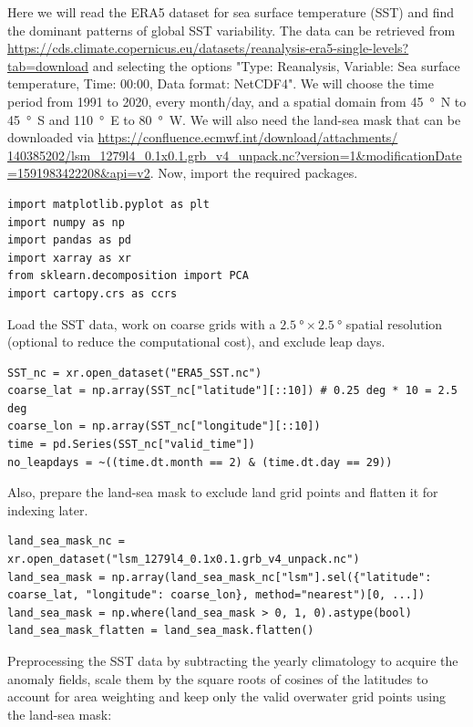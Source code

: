 Here we will read the ERA5 dataset for sea surface temperature (SST) and find the dominant patterns of global SST variability. The data can be retrieved from \href{https://cds.climate.copernicus.eu/datasets/reanalysis-era5-single-levels?tab=download}{https://cds.climate.copernicus.eu/datasets/reanalysis-era5-single-levels?tab=download} and selecting the options "Type: Reanalysis, Variable: Sea surface temperature, Time: 00:00, Data format: NetCDF4". We will choose the time period from 1991 to 2020, every month/day, and a spatial domain from \SI{45}{\degree N} to \SI{45}{\degree S} and \SI{110}{\degree E} to \SI{80}{\degree W}. We will also need the land-sea mask that can be downloaded via \href{https://confluence.ecmwf.int/download/attachments/140385202/lsm_1279l4_0.1x0.1.grb_v4_unpack.nc?version=1&modificationDate=1591983422208&api=v2}{https://confluence.ecmwf.int/download/attachments/\\140385202/lsm\_1279l4\_0.1x0.1.grb\_v4\_unpack.nc?version=1\&modificationDate\\=1591983422208\&api=v2}. Now, import the required packages.
\begin{lstlisting}
import matplotlib.pyplot as plt
import numpy as np
import pandas as pd
import xarray as xr
from sklearn.decomposition import PCA
import cartopy.crs as ccrs
\end{lstlisting}
Load the SST data, work on coarse grids with a $\SI{2.5}{\degree} \times \SI{2.5}{\degree}$ spatial resolution (optional to reduce the computational cost), and exclude leap days.
\begin{lstlisting}
SST_nc = xr.open_dataset("ERA5_SST.nc")
coarse_lat = np.array(SST_nc["latitude"][::10]) # 0.25 deg * 10 = 2.5 deg
coarse_lon = np.array(SST_nc["longitude"][::10])
time = pd.Series(SST_nc["valid_time"])
no_leapdays = ~((time.dt.month == 2) & (time.dt.day == 29))
\end{lstlisting}
Also, prepare the land-sea mask to exclude land grid points and flatten it for indexing later.
\begin{lstlisting}
land_sea_mask_nc = xr.open_dataset("lsm_1279l4_0.1x0.1.grb_v4_unpack.nc")
land_sea_mask = np.array(land_sea_mask_nc["lsm"].sel({"latitude": coarse_lat, "longitude": coarse_lon}, method="nearest")[0, ...])
land_sea_mask = np.where(land_sea_mask > 0, 1, 0).astype(bool)
land_sea_mask_flatten = land_sea_mask.flatten()
\end{lstlisting}
Preprocessing the SST data by subtracting the yearly climatology to acquire the anomaly fields, scale them by the square roots of cosines of the latitudes to account for area weighting and keep only the valid overwater grid points using the land-sea mask:
